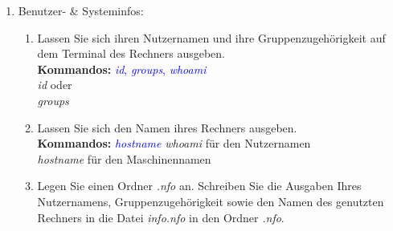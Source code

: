 \documentclass[paper=a4,fontsize=11pt]{scrartcl}%
\numberwithin{equation}{section}
\begin{document}
\begin{enumerate}
\begin{enumerate}
		\item Navigieren Sie in Ihr Heimatverzeichnis. Legen Sie folgenden Ordner, sowie Unterordner mithilfe des \emph{mkdir}-Kommandos an: .\\
		\textit{mkdir -p exercise\_notes/tutorials}\\
		\item Kopieren Sie die Datei bzw. den Ordner \emph{shell\_tutorial} in das eben angelegte Verzeichnis.\\
		\textbf{Kommandos:} \textcolor{blue}{\emph{cp}}\\
			\textit{cp   }
        \item Kopieren Sie die Datei(en) inklusive des Ordners  in das Verzeichnis .\\
        \textbf{Hinweise:} Schauen Sie in die Manpage von cp um herauszufinden, wie Ordner kopiert werden können.\\
        \textbf{Kommandos:} \textcolor{blue}{\emph{man cp}}
		\textit{cp -r  }
        \end{enumerate}
        \footnote{.md steht für Markdown, welches ein Format für Textdateien ist, ähnlich wie .pdf oder .doc-Dateien.}
        \footnote{\url{https://github.com/retext-project}}
         \footnote{Sie können auch mit vi, vim oder emacs arbeiten!}
  \item Benutzer- \& Systeminfos:
        \begin{enumerate}     
          \item Lassen Sie sich ihren Nutzernamen und ihre Gruppenzugehörigkeit auf dem Terminal des Rechners ausgeben.\\
          \textbf{Kommandos:} \textcolor{blue}{\emph{id}, \emph{groups}, \emph{whoami}}\\
          \textit{id} oder\\
          \textit{groups}
          \item Lassen Sie sich den Namen ihres Rechners ausgeben.\\
          \textbf{Kommandos:} \textcolor{blue}{\emph{hostname}}
          \textit{whoami} für den Nutzernamen\\
          \textit{hostname} für den Maschinennamen
          \item Legen Sie einen Ordner \emph{.nfo} an. Schreiben Sie die Ausgaben Ihres Nutzernamens, Gruppenzugehörigkeit sowie den Namen des genutzten Rechners in die Datei \emph{info.nfo} in den Ordner \emph{.nfo}.\\

\end{enumerate}
\end{enumerate}
\end{document}
